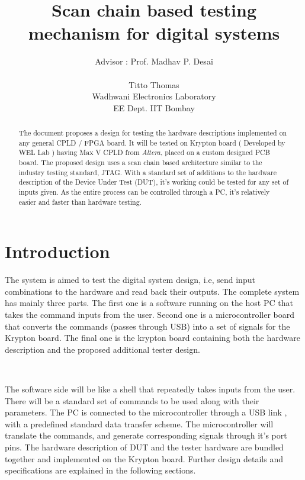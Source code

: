 \documentclass{article}
\title{Scan chain based testing mechanism for digital systems }
\author{Advisor : Prof. Madhav P. Desai \\ \\Titto Thomas \\ Wadhwani Electronics Laboratory \\ EE Dept. IIT Bombay}
\begin{document}
\maketitle

\begin{abstract}
The document proposes a design for testing the hardware descriptions implemented on any general CPLD / FPGA board. It will be tested on Krypton board ( Developed by WEL Lab ) having Max V CPLD from \textit{Altera}, placed on a custom designed PCB board. The proposed design uses a scan chain based architecture similar to the industry testing standard, JTAG. With a standard set of additions to the hardware description of the Device Under Test (DUT), it's working could be tested for any set of inputs given. As the entire process can be controlled through a PC, it's relatively easier and faster than hardware testing.
\end{abstract}

\section{Introduction}
The system is aimed to test the digital system design, i.e, send input combinations to the hardware and read back their outputs. The complete system has mainly three parts. The first one is a software running on the host PC that takes the command inputs from the user. Second one is a microcontroller board that converts the commands (passes through USB) into a set of signals for the Krypton board. The final one is the krypton board containing both the hardware description and the proposed additional tester design.

\begin{figure}[h!]
\centering
\\
\end{figure}
The software side will be like a shell that repeatedly takes inputs from the user. There will be a standard set of commands to be used along with their parameters. The PC is connected to the microcontroller through a USB link , with a predefined standard data transfer scheme. 
The microcontroller will translate the commands, and generate corresponding signals through it's port pins. The hardware description of DUT and the tester hardware are bundled together and implemented on the Krypton board. Further design details and specifications are explained in the following sections.
\end{document}
